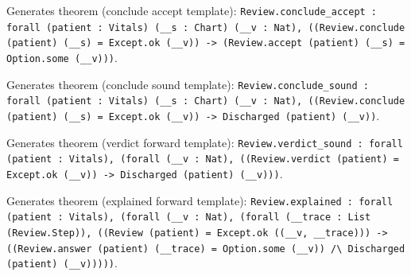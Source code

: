 \documentclass[11pt]{article}
\begin{document}
\noindent Generates theorem (conclude accept template): \texttt{Review.conclude\_accept : forall (patient : Vitals) (\_\_s : Chart) (\_\_v : Nat), ((Review.conclude (patient) (\_\_s) = Except.ok (\_\_v)) -> (Review.accept (patient) (\_\_s) = Option.some (\_\_v)))}.\par
\noindent Generates theorem (conclude sound template): \texttt{Review.conclude\_sound : forall (patient : Vitals) (\_\_s : Chart) (\_\_v : Nat), ((Review.conclude (patient) (\_\_s) = Except.ok (\_\_v)) -> Discharged (patient) (\_\_v))}.\par
\noindent Generates theorem (verdict forward template): \texttt{Review.verdict\_sound : forall (patient : Vitals), (forall (\_\_v : Nat), ((Review.verdict (patient) = Except.ok (\_\_v)) -> Discharged (patient) (\_\_v)))}.\par
\noindent Generates theorem (explained forward template): \texttt{Review.explained : forall (patient : Vitals), (forall (\_\_v : Nat), (forall (\_\_trace : List (Review.Step)), ((Review (patient) = Except.ok ((\_\_v, \_\_trace))) -> ((Review.answer (patient) (\_\_trace) = Option.some (\_\_v)) /\textbackslash{} Discharged (patient) (\_\_v)))))}.\par
\end{document}
